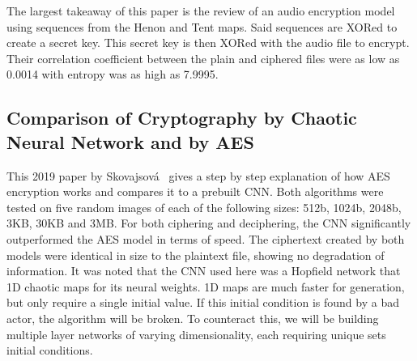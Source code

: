 The largest takeaway of this paper is the review of an audio encryption model using sequences from the Henon and Tent maps.
Said sequences are XORed to create a secret key.
This secret key is then XORed with the audio file to encrypt.
Their correlation coefficient between the plain and ciphered files were as low as 0.0014 with entropy was as high as 7.9995.

\subsection{\textbf{Comparison of Cryptography by Chaotic Neural Network and by AES}\cite{Skovajsova2019}}\label{subsec:comparison-of-cryptography-by-chaotic-neural-network-and-by-aes}

This 2019 paper by Skovajsová~ gives a step by step explanation of how AES encryption works and compares it to a prebuilt CNN\@.
Both algorithms were tested on five random images of each of the following sizes: 512b, 1024b, 2048b, 3KB, 30KB and 3MB\@.
For both ciphering and deciphering, the CNN significantly outperformed the AES model in terms of speed.
The ciphertext created by both models were identical in size to the plaintext file, showing no degradation of information.
It was noted that the CNN used here was a Hopfield network that 1D chaotic maps for its neural weights.
1D maps are much faster for generation, but only require a single initial value.
If this initial condition is found by a bad actor, the algorithm will be broken.
To counteract this, we will be building multiple layer networks of varying dimensionality, each requiring unique sets initial conditions.